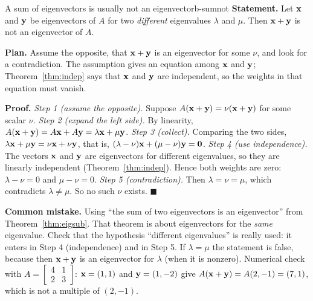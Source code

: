\documentclass[11pt]{article}
\begin{document}
\begin{exmp}{A sum of eigenvectors is usually not an eigenvector}{b-sumnot}
\textbf{Statement.} Let $\mathbf{x}$ and $\mathbf{y}$ be eigenvectors of $A$ for two \emph{different} eigenvalues $\lambda$ and $\mu$. Then $\mathbf{x}+\mathbf{y}$ is not an eigenvector of $A$.

\textbf{Plan.} Assume the opposite, that $\mathbf{x}+\mathbf{y}$ is an eigenvector for some $\nu$, and look for a contradiction. The assumption gives an equation among $\mathbf{x}$ and $\mathbf{y}$; Theorem~\ref{thm:indep} says that $\mathbf{x}$ and $\mathbf{y}$ are independent, so the weights in that equation must vanish.

\textbf{Proof.}
\emph{Step 1 (assume the opposite).} Suppose $A(\mathbf{x}+\mathbf{y})=\nu(\mathbf{x}+\mathbf{y})$ for some scalar $\nu$.
\emph{Step 2 (expand the left side).} By linearity, $A(\mathbf{x}+\mathbf{y})=A\mathbf{x}+A\mathbf{y}=\lambda\mathbf{x}+\mu\mathbf{y}$.
\emph{Step 3 (collect).} Comparing the two sides, $\lambda\mathbf{x}+\mu\mathbf{y}=\nu\mathbf{x}+\nu\mathbf{y}$, that is, $(\lambda-\nu)\mathbf{x}+(\mu-\nu)\mathbf{y}=\mathbf{0}$.
\emph{Step 4 (use independence).} The vectors $\mathbf{x}$ and $\mathbf{y}$ are eigenvectors for different eigenvalues, so they are linearly independent (Theorem~\ref{thm:indep}). Hence both weights are zero: $\lambda-\nu=0$ and $\mu-\nu=0$.
\emph{Step 5 (contradiction).} Then $\lambda=\nu=\mu$, which contradicts $\lambda\neq\mu$. So no such $\nu$ exists. \qquad$\blacksquare$

\textbf{Common mistake.} Using ``the sum of two eigenvectors is an eigenvector'' from Theorem~\ref{thm:eigsub}. That theorem is about eigenvectors for the \emph{same} eigenvalue. Check that the hypothesis ``different eigenvalues'' is really used: it enters in Step 4 (independence) and in Step 5. If $\lambda=\mu$ the statement is false, because then $\mathbf{x}+\mathbf{y}$ is an eigenvector for $\lambda$ (when it is nonzero). Numerical check with $A=\begin{bmatrix}4&1\\2&3\end{bmatrix}$: $\mathbf{x}=(1,1)$ and $\mathbf{y}=(1,-2)$ give $A(\mathbf{x}+\mathbf{y})=A(2,-1)=(7,1)$, which is not a multiple of $(2,-1)$.
\end{exmp}
\end{document}
